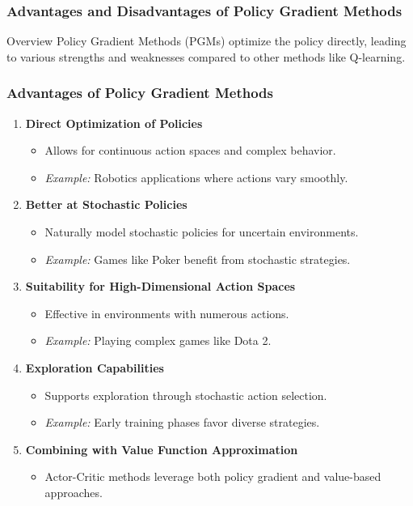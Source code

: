 \documentclass[aspectratio=169]{beamer}
\begin{document}
\begin{frame}[fragile]
    \frametitle{Advantages and Disadvantages of Policy Gradient Methods}
    \begin{block}{Overview}
        Policy Gradient Methods (PGMs) optimize the policy directly, leading to various strengths and weaknesses compared to other methods like Q-learning.
    \end{block}
\end{frame}

\begin{frame}[fragile]
    \frametitle{Advantages of Policy Gradient Methods}
    \begin{enumerate}
        \item \textbf{Direct Optimization of Policies}
            \begin{itemize}
                \item Allows for continuous action spaces and complex behavior.
                \item \textit{Example:} Robotics applications where actions vary smoothly.
            \end{itemize}
        \item \textbf{Better at Stochastic Policies}
            \begin{itemize}
                \item Naturally model stochastic policies for uncertain environments.
                \item \textit{Example:} Games like Poker benefit from stochastic strategies.
            \end{itemize}
        \item \textbf{Suitability for High-Dimensional Action Spaces}
            \begin{itemize}
                \item Effective in environments with numerous actions.
                \item \textit{Example:} Playing complex games like Dota 2.
            \end{itemize}
        \item \textbf{Exploration Capabilities}
            \begin{itemize}
                \item Supports exploration through stochastic action selection.
                \item \textit{Example:} Early training phases favor diverse strategies.
            \end{itemize}
        \item \textbf{Combining with Value Function Approximation}
            \begin{itemize}
                \item Actor-Critic methods leverage both policy gradient and value-based approaches.
            \end{itemize}
    \end{enumerate}
\end{frame}
\end{document}
